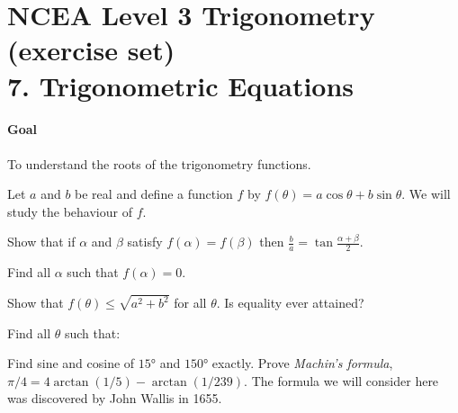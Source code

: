 \documentclass[answers]{exam}
\begin{document}
\section*{NCEA Level 3 Trigonometry (exercise set)\\7. Trigonometric Equations}
\paragraph{Goal} To understand the roots of the trigonometry functions.

\begin{questions}
  \question Let $ a $ and $ b $ be real and define a function $ f $ by $ f(\theta) = a \cos \theta + b \sin \theta $. We will study the behaviour of $ f $.
    \begin{parts}
      \item Show that if $ \alpha $ and $ \beta $ satisfy $ f(\alpha) = f(\beta) $ then $ \frac{b}{a} = \tan \frac{\alpha + \beta}{2} $.
      \item Find all $ \alpha $ such that $ f(\alpha) = 0 $.
      \item Show that $ f(\theta) \leq \sqrt{a^2 + b^2} $ for all $ \theta $. Is equality ever attained?
    \end{parts}
  \question Find all $ \theta $ such that:
  \question Find sine and cosine of $ \ang{15} $ and $ \ang{150} $ exactly.
  \question Prove \emph{Machin's formula}, $ \pi/4 = 4\arctan (1/5) - \arctan (1/239) $.
  \question The formula we will consider here was discovered by John Wallis in 1655.
    \begin{parts}

\end{parts}
\end{questions}
\end{document}
